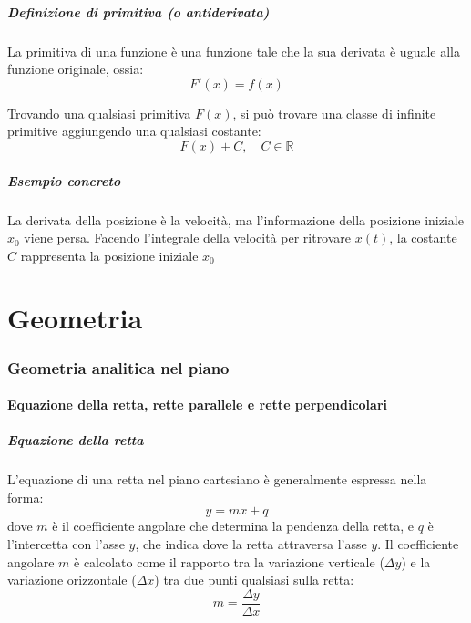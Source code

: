 \documentclass{article}
\begin{document}
\subsubsection{Definizione di primitiva (o antiderivata)}
La primitiva di una funzione è una funzione tale che la sua derivata è uguale alla funzione
originale, ossia:
\[
    F'(x)=f(x)    
\]

Trovando una qualsiasi primitiva \(F(x)\), si può trovare una classe di infinite primitive
aggiungendo una qualsiasi costante:
\[
    F(x)+C,
    \quad C\in\mathbb{R}  
\]

\subsubsection{Esempio concreto}
La derivata della posizione è la velocità, ma l'informazione della posizione iniziale \(x_0\)
viene persa. Facendo l'integrale della velocità per ritrovare \(x(t)\), la costante \(C\)
rappresenta la posizione iniziale \(x_0\)

\newpage
\part{Geometria}

\section{Geometria analitica nel piano}

\subsection{Equazione della retta, rette parallele e rette perpendicolari}

\subsubsection{Equazione della retta}
L'equazione di una retta nel piano cartesiano è generalmente espressa nella forma:
\[
    y = mx + q
\]
dove \(m\) è il coefficiente angolare che determina la pendenza della retta, e \(q\) è
l'intercetta con l'asse \(y\), che indica dove la retta attraversa l'asse \(y\).
Il coefficiente angolare \(m\) è calcolato come il rapporto tra la variazione verticale
(\(\Delta y\)) e la variazione orizzontale (\(\Delta x\)) tra due punti qualsiasi sulla retta:
\[
    m = \frac{\Delta y}{\Delta x}
\]

\end{document}
